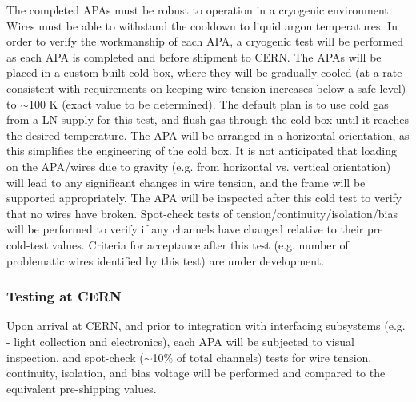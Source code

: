 The completed APAs must be robust to operation in a cryogenic environment.  Wires must be able to withstand the cooldown to liquid argon temperatures.  In order to verify the workmanship of each APA, a cryogenic test will be performed as each APA is completed and before shipment to CERN.  The APAs will be placed in a custom-built cold box, where they will be gradually cooled (at a rate consistent with requirements on keeping wire tension increases below a safe level) to $\sim$100 K (exact value to be determined).  The default plan is to use cold gas from a LN supply for this test, and flush gas through the cold box until it reaches the desired temperature.  The APA will be arranged in a horizontal orientation, as this simplifies the engineering of the cold box.  It is not anticipated that loading on the APA/wires due to gravity (e.g. from horizontal vs. vertical orientation) will lead to any significant changes in wire tension, and the frame will be supported appropriately.  The APA will be inspected after this cold test to verify that no wires have broken.  Spot-check tests of tension/continuity/isolation/bias will be performed to verify if any channels have changed relative to their pre cold-test values.  Criteria for acceptance after this test (e.g. number of problematic wires identified by this test) are under development.


\subsubsection{Testing at CERN}

Upon arrival at CERN, and prior to integration with interfacing subsystems (e.g. - light collection and electronics), each APA will be subjected to visual inspection, and spot-check ($\sim$10$\%$ of total channels) tests for wire tension, continuity, isolation, and bias voltage will be performed and compared to the equivalent pre-shipping values.


